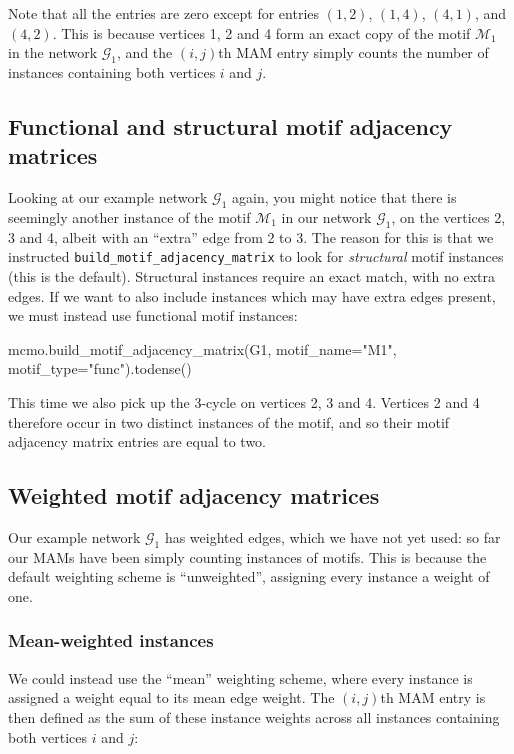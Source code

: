 \documentclass{article}
\begin{document}
Note that all the entries are zero except for entries
$(1,2)$,
$(1,4)$,
$(4,1)$,
and
$(4,2)$.
This is because vertices 1, 2 and 4 form an exact copy of
the motif $\mathcal{M}_1$ in the network $\mathcal{G}_1$,
and the  $(i,j)$th MAM entry simply counts the number of instances
containing both vertices $i$ and $j$.

\subsection{Functional and structural motif adjacency matrices}

Looking at our example network $\mathcal{G}_1$ again,
you might notice that there is seemingly another instance
of the motif $\mathcal{M}_1$
in our network $\mathcal{G}_1$,
on the vertices 2, 3 and 4,
albeit with an ``extra'' edge from 2 to 3.
The reason for this is that we instructed
\texttt{build\_motif\_adjacency\_matrix}
to look for \emph{structural} motif instances (this is the default).
Structural instances require an exact match, with no extra edges.
If we want to also include instances which may have extra edges present,
we must instead use functional motif instances:


\begin{pyconsole}
mcmo.build_motif_adjacency_matrix(G1, motif_name="M1",
  motif_type="func").todense()
\end{pyconsole}

This time we also pick up the 3-cycle on vertices 2, 3 and 4.
Vertices 2 and 4 therefore occur in two distinct instances
of the motif, and so their motif adjacency matrix entries are equal
to two.

\subsection{Weighted motif adjacency matrices}

Our example network $\mathcal{G}_1$ has weighted edges,
which we have not yet used:
so far our MAMs have been simply counting
instances of motifs.
This is because the default weighting scheme is
``unweighted'', assigning every instance a weight of one.

\subsubsection{Mean-weighted instances}

We could instead use the ``mean'' weighting scheme,
where every instance is assigned a weight equal to its
mean edge weight.
The $(i,j)$th MAM entry is then defined as the sum of these
instance weights across all instances containing
both vertices $i$ and $j$:
\end{document}
